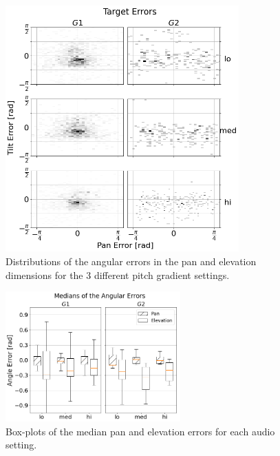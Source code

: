 \documentclass[acmsmall]{acmart}
\begin{document}
\begin{figure}
  \centering
  \includegraphics[width=0.8\textwidth]{figures/target_errors.png}
  \caption{Distributions of the angular errors in the pan and elevation dimensions for the 3 different pitch gradient settings. }\label{fig:target-errors}
\end{figure}

\begin{figure}
  \centering
  \includegraphics[width=0.6\textwidth]{figures/boxplot_target_search_median_error.png}
  \caption{Box-plots of the median pan and elevation errors for each audio setting. }\label{fig:target-boxplot-error}
\end{figure}
\end{document}
